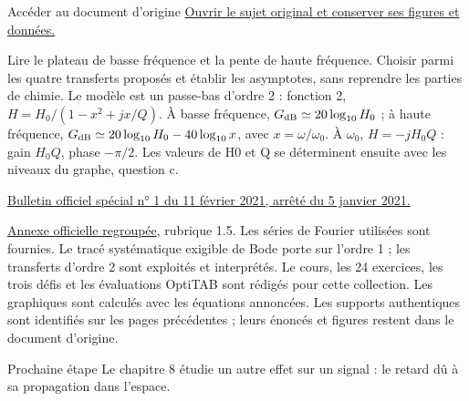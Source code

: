 \begin{loi}{Accéder au document d’origine}
\href{https://mpsi.schleck.ovh/fichiers/devoirs/2025-2026/ds04_enonce.pdf}{Ouvrir le sujet original et conserver ses figures et données.}
\end{loi}
Lire le plateau de basse fréquence et la pente de haute fréquence. Choisir parmi les quatre transferts proposés et établir les asymptotes, sans reprendre les parties de chimie.
Le modèle est un passe-bas d’ordre 2 : fonction 2, $H=H_0/(1-x^2+jx/Q)$. À basse fréquence, $G_{\rm dB}\simeq20\log_{10}H_0$ ; à haute fréquence, $G_{\rm dB}\simeq20\log_{10}H_0-40\log_{10}x$, avec $x=\omega/\omega_0$. À $\omega_0$, $H=-jH_0Q$ : gain $H_0Q$, phase $-\pi/2$. Les valeurs de H0 et Q se déterminent ensuite avec les niveaux du graphe, question c.

\href{https://www.education.gouv.fr/bo/21/Special1/ESRS2035779A.htm}{Bulletin officiel spécial n° 1 du 11 février 2021, arrêté du 5 janvier 2021.}\par
\href{https://cache.media.education.gouv.fr/file/SPE1-MEN-MESRI-4-2-2021/64/8/spe779_annexe_1373648.pdf}{Annexe officielle regroupée}, rubrique 1.5. Les séries de Fourier utilisées sont fournies. Le tracé systématique exigible de Bode porte sur l’ordre 1 ; les transferts d’ordre 2 sont exploités et interprétés.
Le cours, les 24 exercices, les trois défis et les évaluations OptiTAB sont rédigés pour cette collection. Les graphiques sont calculés avec les équations annoncées. Les supports authentiques sont identifiés sur les pages précédentes ; leurs énoncés et figures restent dans le document d’origine.
\begin{methode}{Prochaine étape}
Le chapitre 8 étudie un autre effet sur un signal : le retard dû à sa propagation dans l’espace.
\end{methode}

